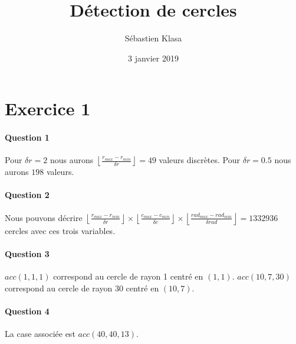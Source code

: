 \documentclass{article}
\title{Détection de cercles}
\author{Sébastien Klasa}
\date{3 janvier 2019}
\begin{document}
\maketitle

\section{Exercice 1}

\paragraph{Question 1} Pour $\delta r = 2$ nous aurons $\left\lfloor \frac{r_{max} - r_{min}}{\delta r} \right\rfloor = 49$ valeurs discrètes. Pour $\delta r = 0.5$ nous aurons $198$ valeurs.

\paragraph{Question 2} Nous pouvons décrire $\left\lfloor \frac{r_{max} - r_{min}}{\delta r} \right\rfloor \times \left\lfloor \frac{c_{max} - c_{min}}{\delta c} \right\rfloor \times \left\lfloor \frac{rad_{max} - rad_{min}}{\delta rad} \right\rfloor = 1332936$ cercles avec ces trois variables.

\paragraph{Question 3} $acc(1,1,1)$ correspond au cercle de rayon 1 centré en $(1,1)$. $acc(10,7,30)$ correspond au cercle de rayon 30 centré en $(10,7)$.

\paragraph{Question 4} La case associée est $acc(40,40,13)$.
\end{document}
